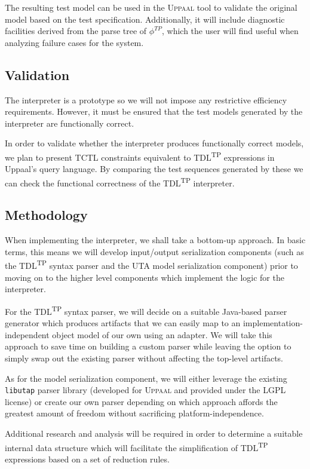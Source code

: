 \documentclass[12pt,oneside,a4paper,draft,notitlepage]{article}
\begin{document}
	\par The resulting test model can be used in the \textsc{Uppaal} tool to validate the original model based on the test specification. Additionally, it will include diagnostic facilities derived from the parse tree of $\phi^{TP}$, which the user will find useful when analyzing failure cases for the system.

	\subsection*{Validation}
	\par The interpreter is a prototype so we will not impose any restrictive efficiency requirements. However, it must be ensured that the test models generated by the interpreter are functionally correct.

	\bigskip

	\par In order to validate whether the interpreter produces functionally correct models, we plan to present TCTL constraints equivalent to TDL\textsuperscript{TP} expressions in Uppaal's query language. By comparing the test sequences generated by these we can check the functional correctness of the TDL\textsuperscript{TP} interpreter.

	\subsection*{Methodology}
	\par When implementing the interpreter, we shall take a bottom-up approach. In basic terms, this means we will develop input/output serialization components (such as the TDL\textsuperscript{TP} syntax parser and the UTA model serialization component) prior to moving on to the higher level components which implement the logic for the interpreter.

	\bigskip

	\par For the TDL\textsuperscript{TP} syntax parser, we will decide on a suitable Java-based parser generator which produces artifacts that we can easily map to an implementation-independent object model of our own using an adapter. We will take this approach to save time on building a custom parser while leaving the option to simply swap out the existing parser without affecting the top-level artifacts.

	\bigskip

	\par As for the model serialization component, we will either leverage the existing \texttt{libutap} parser library \cite{libutapsite} (developed for \textsc{Uppaal} and provided under the LGPL license) or create our own parser depending on which approach affords the greatest amount of freedom without sacrificing platform-independence.

	\bigskip

	\par Additional research and analysis will be required in order to determine a suitable internal data structure which will facilitate the simplification of TDL\textsuperscript{TP} expressions based on a set of reduction rules.

	\bigskip

	\printbibliography[
		title=Sources
	]
\end{document}
